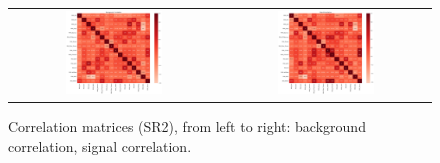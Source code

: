 \begin{figure}[tbh!]
 \begin{center}
 \begin{tabular}{cc}
  \includegraphics[width=0.48\textwidth]{figures/Part3/BDT/corr_bkg_SR2}&
  \includegraphics[width=0.48\textwidth]{figures/Part3/BDT/corr_signal_SR2}\\
 \end{tabular}
 \caption{Correlation matrices (SR2), from left to right: background correlation, signal correlation.}
 \label{fig:Ranking}
 \end{center}
\end{figure}

\clearpage
